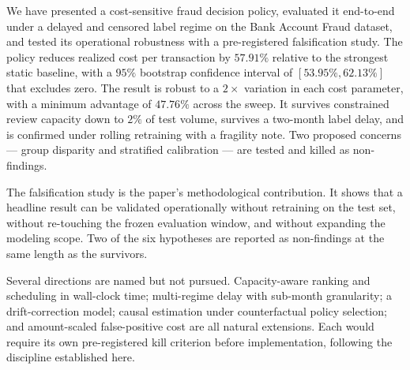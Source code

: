 \documentclass[conference]{IEEEtran}
\begin{document}
We have presented a cost-sensitive fraud decision policy, evaluated it
end-to-end under a delayed and censored label regime on the Bank Account
Fraud dataset, and tested its operational robustness with a pre-registered
falsification study. The policy reduces realized cost per transaction by
$57.91\%$ relative to the strongest static baseline, with a $95\%$ bootstrap
confidence interval of $[53.95\%, 62.13\%]$ that excludes zero. The result
is robust to a $2\times$ variation in each cost parameter, with a minimum
advantage of $47.76\%$ across the sweep. It survives constrained review
capacity down to $2\%$ of test volume, survives a two-month label delay,
and is confirmed under rolling retraining with a fragility note. Two
proposed concerns --- group disparity and stratified calibration --- are
tested and killed as non-findings.

The falsification study is the paper's methodological contribution. It
shows that a headline result can be validated operationally without
retraining on the test set, without re-touching the frozen evaluation
window, and without expanding the modeling scope. Two of the six
hypotheses are reported as non-findings at the same length as the
survivors.

Several directions are named but not pursued. Capacity-aware ranking and
scheduling in wall-clock time; multi-regime delay with sub-month
granularity; a drift-correction model; causal estimation under
counterfactual policy selection; and amount-scaled false-positive cost are
all natural extensions. Each would require its own pre-registered kill
criterion before implementation, following the discipline established here.
\end{document}
